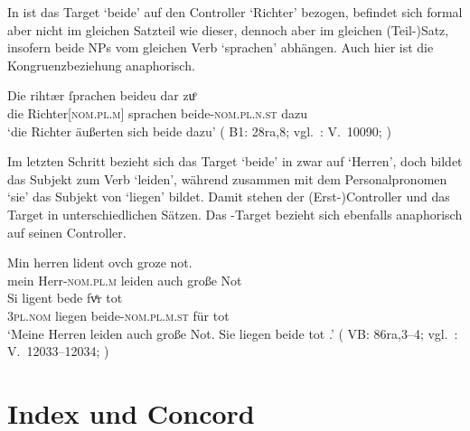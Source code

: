 In  ist das Target  `beide' auf den
Controller  `Richter' bezogen, befindet sich formal aber nicht im
gleichen Satzteil wie dieser, dennoch aber im gleichen (Teil-)Satz, insofern
beide NPs vom gleichen Verb  `sprachen' abhängen. Auch hier ist
die Kongruenzbeziehung anaphorisch.

\begin{exe}
\ex \label{ex:beidedomains_3}
	\gll Die rihtær ſprachen beideu {dar zuͦ} \\
		die Richter[\textsc{nom.pl.m}] sprachen beide-\textsc{nom.pl.n.st}
			dazu \\
	\trans `die Richter äußerten sich beide dazu'
		(%
			B1: 28ra,8;
			vgl.~\KC: V.~10090; \cite[267]{schroeder1895}%
		)
\end{exe}

Im letzten Schritt bezieht sich das Target  `beide' in
 zwar auf  `Herren', doch bildet
 das Subjekt zum Verb  `leiden', während
 zusammen mit dem Personalpronomen  `sie' das
Subjekt von  `liegen' bildet. Damit stehen der (Erst-)Controller
 und das Target  in unterschiedlichen Sätzen. Das
-Target bezieht sich ebenfalls anaphorisch auf seinen
Controller.

\begin{exe}
	\ex \label{ex:beidedomains_4}
		\gll Min herren lident ovch groze not. \\
			mein Herr-\textsc{nom.pl.m} leiden auch große Not \\
	\sn \gll Si ligent bede fvͤr tot \\
			\textsc{3pl\subM.nom} liegen beide-\textsc{nom.pl.m.st} für tot \\
	\trans `Meine Herren leiden auch große Not. Sie liegen beide tot
		.'
		(%
			VB: 86ra,3--4;
			vgl.~\KC: V.~12033--12034; \cite[301]{schroeder1895}%
		)		
\end{exe}


\section{Index und Concord}
\label{sec:indexconcord}


